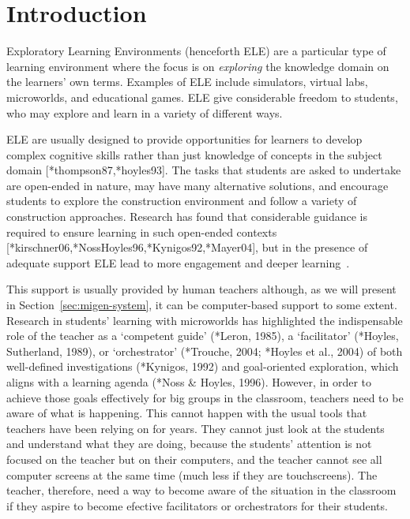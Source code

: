 
\section{Introduction}
\label{sec:introduction}


Exploratory Learning Environments (henceforth ELE) are a particular
type of learning environment where the focus is on \emph{exploring}
the knowledge domain on the learners' own terms. Examples of ELE
include simulators, virtual labs, microworlds, and educational
games. ELE give considerable freedom to students, who may explore and
learn in a variety of different ways.

ELE are usually designed to provide opportunities for learners to
develop complex 
cognitive skills rather than just knowledge of concepts in the subject
domain [*thompson87,*hoyles93]. The tasks that students are asked to
undertake are open-ended in nature, may have many alternative
solutions, and encourage students to explore the construction
environment and follow a variety of construction approaches. Research
has found that considerable guidance is required to ensure learning in
such open-ended contexts [*kirschner06,*NossHoyles96,*Kynigos92,*Mayer04],
but in the presence of adequate support ELE lead to more engagement
and deeper learning~\cite{deeperLearning}. 

This support is usually provided by human teachers although, as we
will present in Section~\ref{sec:migen-system}, it can be
computer-based support to some extent.
%
%
Research in students’ learning with microworlds has highlighted
the indispensable role of the teacher as a ‘competent guide’ (*Leron,
1985), a ‘facilitator’ (*Hoyles, Sutherland, 1989), or ‘orchestrator’
(*Trouche, 2004; *Hoyles et al., 2004) of both well-defined
investigations (*Kynigos, 1992) and goal-oriented exploration, which
aligns with a learning agenda (*Noss \& Hoyles, 1996). However, in
order to achieve those goals effectively for big groups in the
classroom, teachers need to be aware of what is happening. This cannot
happen with the usual tools that teachers have been relying on for
years. They cannot just look at the students and understand what they
are doing, because the students' attention is not focused on the
teacher but on their computers, and the teacher cannot see all
computer screens at the same time (much less if they are
touchscreens). The teacher, therefore, need a way to become aware of
the situation in the classroom if they aspire to become efective
facilitators or orchestrators for their students. 

